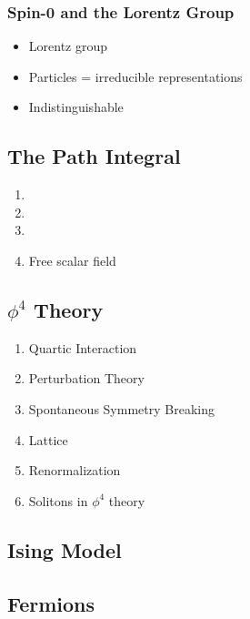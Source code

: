 \documentclass[12pt]{article}
\begin{document}
\subsubsection{Spin-0 and the Lorentz Group}

\begin{itemize}
\item Lorentz group
\item Particles = irreducible representations
\item Indistinguishable
\end{itemize}





\subsection{The Path Integral}







\begin{enumerate}
\item 
\item 
\item 
\item Free scalar field
\end{enumerate}


\subsection{{\boldmath $\phi^4$} Theory}

\begin{enumerate}
\item Quartic Interaction
\item Perturbation Theory
\item Spontaneous Symmetry Breaking
\item Lattice
\item Renormalization
\item Solitons in $\phi^4$ theory
\end{enumerate}



\subsection{Ising Model}


\subsection{Fermions}
\end{document}
